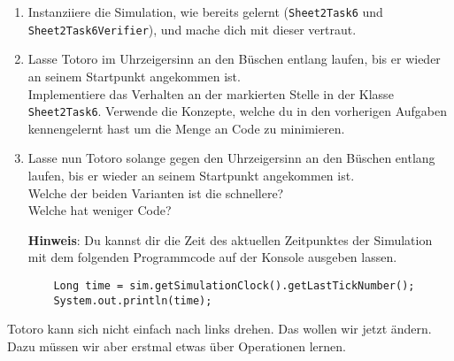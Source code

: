 

\begin{enumerate}
    \item Instanziiere die Simulation, wie bereits gelernt (\lstinline{Sheet2Task6} und \lstinline{Sheet2Task6Verifier}), und mache dich mit dieser vertraut.
    \item Lasse Totoro im Uhrzeigersinn an den Büschen entlang laufen, bis er wieder an seinem Startpunkt angekommen ist.\\
    Implementiere das Verhalten an der markierten Stelle in der Klasse \lstinline{Sheet2Task6}. 
    Verwende die Konzepte, welche du in den vorherigen Aufgaben kennengelernt hast um die Menge an Code zu minimieren.
    \item Lasse nun Totoro solange gegen den Uhrzeigersinn an den Büschen entlang laufen, bis er wieder an seinem Startpunkt angekommen ist.\\
    Welche der beiden Varianten ist die schnellere?\\
    Welche hat weniger Code?
    
    \textbf{Hinweis}: Du kannst dir die Zeit des aktuellen Zeitpunktes der Simulation mit dem folgenden Programmcode auf der Konsole ausgeben lassen.

        \begin{lstlisting}
    Long time = sim.getSimulationClock().getLastTickNumber();
    System.out.println(time);
        \end{lstlisting}

        
\end{enumerate}

        Totoro kann sich nicht einfach nach links drehen.
        Das wollen wir jetzt ändern.
        Dazu müssen wir aber erstmal etwas über Operationen lernen.

